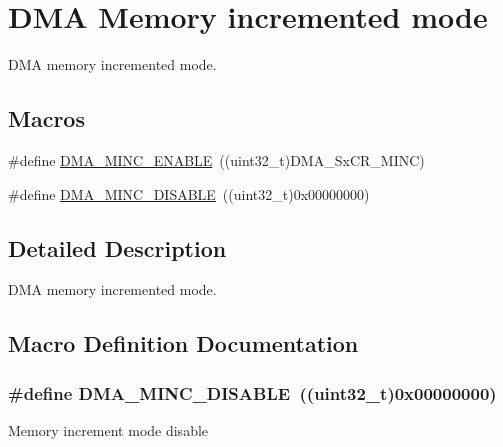\hypertarget{group___d_m_a___memory__incremented__mode}{}\section{D\+MA Memory incremented mode}
\label{group___d_m_a___memory__incremented__mode}


D\+MA memory incremented mode.  


\subsection*{Macros}
\begin{DoxyCompactItemize}
\item 
\#define \hyperlink{group___d_m_a___memory__incremented__mode_ga43d30885699cc8378562316ff4fed1cd}{D\+M\+A\+\_\+\+M\+I\+N\+C\+\_\+\+E\+N\+A\+B\+LE}~((uint32\+\_\+t)D\+M\+A\+\_\+\+Sx\+C\+R\+\_\+\+M\+I\+NC)
\item 
\#define \hyperlink{group___d_m_a___memory__incremented__mode_ga32625330516c188151743473fad97a33}{D\+M\+A\+\_\+\+M\+I\+N\+C\+\_\+\+D\+I\+S\+A\+B\+LE}~((uint32\+\_\+t)0x00000000)
\end{DoxyCompactItemize}


\subsection{Detailed Description}
D\+MA memory incremented mode. 



\subsection{Macro Definition Documentation}
\subsubsection[{\texorpdfstring{D\+M\+A\+\_\+\+M\+I\+N\+C\+\_\+\+D\+I\+S\+A\+B\+LE}{DMA_MINC_DISABLE}}]{\setlength{\rightskip}{0pt plus 5cm}\#define D\+M\+A\+\_\+\+M\+I\+N\+C\+\_\+\+D\+I\+S\+A\+B\+LE~((uint32\+\_\+t)0x00000000)}\hypertarget{group___d_m_a___memory__incremented__mode_ga32625330516c188151743473fad97a33}{}\label{group___d_m_a___memory__incremented__mode_ga32625330516c188151743473fad97a33}
Memory increment mode disable 
